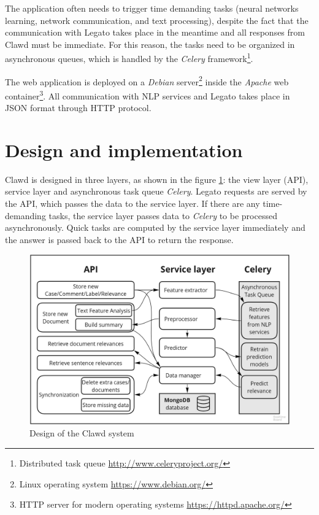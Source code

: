 \documentclass[
  digital, %
  notable,   %
  nolof,     %
  nolot,     %
  draft
]{fithesis3}
\begin{document}
The application often needs to trigger time demanding tasks (neural networks learning, network communication, and text processing), despite the fact that the communication with Legato takes place in the meantime and all responses from Clawd must be immediate.
For this reason, the tasks need to be organized in asynchronous queues, which is handled by the \textit{Celery} framework\footnote{Distributed task queue \url{http://www.celeryproject.org/}}.

The web application is deployed on a \textit{Debian} server\footnote{Linux operating system \url{https://www.debian.org/}} inside the \textit{Apache} web container\footnote{HTTP server for modern operating systems \url{https://httpd.apache.org/}}.
All communication with NLP services and Legato takes place in JSON format through HTTP protocol.

\section{Design and implementation}
Clawd is designed in three layers, as shown in the figure \ref{fig:Design}: the view layer (API), service layer and asynchronous task queue \textit{Celery}.
Legato requests are served by the API, which passes the data to the service layer.
If there are any time-demanding tasks, the service layer passes data to \textit{Celery} to be processed asynchronously.
Quick tasks are computed by the service layer immediately and the answer is passed back to the API to return the response.

\begin{figure}[h]
\caption{Design of the Clawd system}
\label{fig:Design}
\includegraphics[width=\textwidth]{img/Design}
\end{figure}
\end{document}
